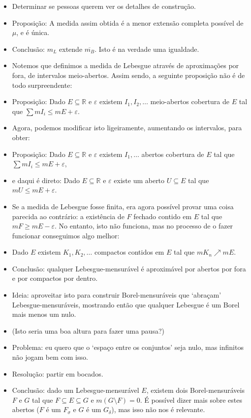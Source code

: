 \documentclass{article}
\newcommand{\R}{\mathbb{R}}
\begin{document}
\begin{itemize}
\item Determinar se pessoas querem ver os detalhes de construção.
\item Proposição: A medida assim obtida é a menor extensão completa possível de $\mu$, e é única.
\item Conclusão: $m_L$ extende $\overline{m_B}$. Isto é na verdade uma igualdade. 
\item Notemos que definimos a medida de Lebesgue através de aproximações por fora, de intervalos meio-abertos. Assim sendo, a seguinte proposição não é de todo surpreendente:
\item Proposição: Dado $E \subseteq \R$ e $\varepsilon$ existem $I_1, I_2, \dots$ meio-abertos cobertura de $E$ tal que $\sum m I_i \leq m E + \varepsilon$.
\item Agora, podemos modificar isto ligeiramente, aumentando os intervalos, para obter:
\item Proposição: Dado $E \subseteq \R$ e $\varepsilon$ existem $I_1, \dots$ abertos cobertura de $E$ tal que $\sum m I_i \leq m E + \varepsilon$,
\item e daqui é direto: Dado $E \subseteq \R$ e $\varepsilon$ existe um aberto $U \subseteq E$ tal que $m U \leq m E + \varepsilon$.
\item Se a medida de Lebesgue fosse finita, era agora possível provar uma coisa parecida ao contrário: a existência de $F$ fechado contido em $E$ tal que $m F \geq m E - \varepsilon$. No entanto, isto não funciona, mas no processo de o fazer funcionar conseguimos algo melhor:
\item Dado $E$ existem $K_1, K_2, \dots$ compactos contidos em $E$ tal que $m K_n \nearrow m E$.
\item Conclusão: qualquer Lebesgue-mensurável é aproximável por abertos por fora e por compactos por dentro.
\item Ideia: aproveitar isto para construir Borel-mensuráveis que `abraçam' Lebesgue-mensuráveis, mostrando então que qualquer Lebesgue é um Borel mais menos um nulo.
\item (Isto seria uma boa altura para fazer uma pausa?)
\item Problema: eu quero que o `espaço entre os conjuntos' seja nulo, mas infinitos não jogam bem com isso.
\item Resolução: partir em bocados.
\item Conclusão: dado um Lebesgue-mensurável $E$, existem dois Borel-mensuráveis $F$ e $G$ tal que $F \subseteq E \subseteq G$ e $m(G \setminus F) = 0$. É possível dizer mais sobre estes abertos ($F$ é um $F_\sigma$ e $G$ é um $G_\delta$), mas isso não nos é relevante.

\end{itemize}
\end{document}

